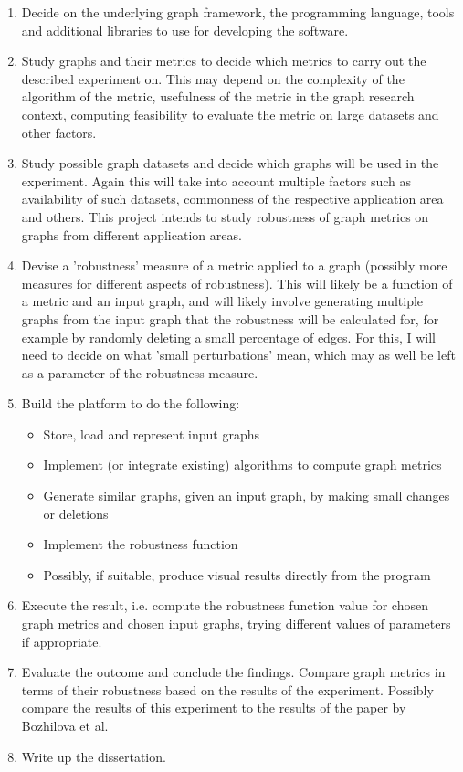 \begin{enumerate}

    \item Decide on the underlying graph framework, the programming language, tools and additional libraries to use for developing the software.

    \item Study graphs and their metrics to decide which metrics to carry out the described experiment on. This may depend on the complexity of the algorithm of the metric, usefulness of the metric in the graph research context, computing feasibility to evaluate the metric on large datasets and other factors.

    \item Study possible graph datasets and decide which graphs will be used in the experiment. Again this will take into account multiple factors such as availability of such datasets, commonness of the respective application area and others. This project intends to study robustness of graph metrics on graphs from different application areas.

    \item Devise a 'robustness' measure of a metric applied to a graph (possibly more measures for different aspects of robustness). This will likely be a function of a metric and an input graph, and will likely involve generating multiple graphs from the input graph that the robustness will be calculated for, for example by randomly deleting a small percentage of edges. For this, I will need to decide on what 'small perturbations' mean, which may as well be left as a parameter of the robustness measure.

    \item Build the platform to do the following:
    \begin{itemize}
        \item Store, load and represent input graphs
        \item Implement (or integrate existing) algorithms to compute graph metrics
        \item Generate similar graphs, given an input graph, by making small changes or deletions
        \item Implement the robustness function
        \item Possibly, if suitable, produce visual results directly from the program
    \end{itemize}

    \item Execute the result, i.e. compute the robustness function value for chosen graph metrics and chosen input graphs, trying different values of parameters if appropriate.

    \item Evaluate the outcome and conclude the findings. Compare graph metrics in terms of their robustness based on the results of the experiment. Possibly compare the results of this experiment to the results of the paper by Bozhilova et al.

    \item Write up the dissertation.

\end{enumerate}

